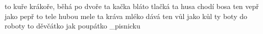 
\chyph
\fontfam [lm]
\parindent 0pt
   {to kuře krákoře, běhá po dvoře}
 {ta kačka bláto tlačká}
   {ta husa chodí bosa}
   {ten vepř jako pepř}
   {to tele hubou mele}
  {ta kráva mléko dává}
   {ten vůl jako kůl}
   {ty boty do roboty}
  {to děvčátko jak poupátko}
\vysazej_pisnicku
\endmulti
\bye
